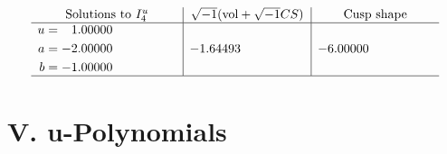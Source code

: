 \documentclass[1p]{elsarticle_modified}
\theoremstyle{definition}
\newcommand{\I}{\sqrt{-1}}
\begin{document}
$$\begin{array}{c|c|c}  
\text{Solutions to }I^u_{4}& \I (\text{vol} + \sqrt{-1}CS) & \text{Cusp shape}\\
 \hline 
\begin{aligned}
u &= \phantom{-}1.00000\phantom{ +0.000000I} \\
a &= -2.00000\phantom{ +0.000000I} \\
b &= -1.00000\phantom{ +0.000000I}\end{aligned}
 & -1.64493\phantom{ +0.000000I} & -6.00000\phantom{ +0.000000I}\\
 \hline 
 \end{array}$$\newpage
\newpage\renewcommand{\arraystretch}{1}
\centering \section*{ V. u-Polynomials}
\end{document}

